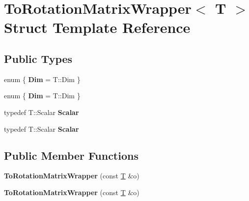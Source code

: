 \hypertarget{struct_to_rotation_matrix_wrapper}{}\section{To\+Rotation\+Matrix\+Wrapper$<$ T $>$ Struct Template Reference}
\label{struct_to_rotation_matrix_wrapper}
\subsection*{Public Types}
\begin{DoxyCompactItemize}
\item 
\mbox{\label{struct_to_rotation_matrix_wrapper_a0e18a4e2dbc06467285575331c55fec5}} 
enum \{ {\bfseries Dim} = T\+:\+:Dim
 \}
\item 
\mbox{\label{struct_to_rotation_matrix_wrapper_a2859be60c347964a2b039a2da456a38f}} 
enum \{ {\bfseries Dim} = T\+:\+:Dim
 \}
\item 
\mbox{\label{struct_to_rotation_matrix_wrapper_a6f1ce3b7deda7d9f0e83d8d34d262107}} 
typedef T\+::\+Scalar {\bfseries Scalar}
\item 
\mbox{\label{struct_to_rotation_matrix_wrapper_a6f1ce3b7deda7d9f0e83d8d34d262107}} 
typedef T\+::\+Scalar {\bfseries Scalar}
\end{DoxyCompactItemize}
\subsection*{Public Member Functions}
\begin{DoxyCompactItemize}
\item 
\mbox{\label{struct_to_rotation_matrix_wrapper_a0bb1d307b3ee31adac2b878c893dd77f}} 
{\bfseries To\+Rotation\+Matrix\+Wrapper} (const \hyperlink{group___sparse_core___module}{T} \&o)
\item 
\mbox{\label{struct_to_rotation_matrix_wrapper_a0bb1d307b3ee31adac2b878c893dd77f}} 
{\bfseries To\+Rotation\+Matrix\+Wrapper} (const \hyperlink{group___sparse_core___module}{T} \&o)
\end{DoxyCompactItemize}
